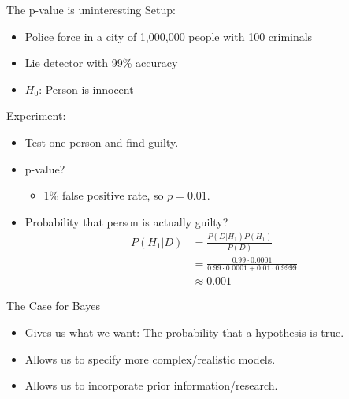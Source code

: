 \begin{frame}{The p-value is uninteresting}
Setup:
	\begin{itemize}
		\item Police force in a city of 1,000,000 people with 100 criminals
		\item Lie detector with 99\% accuracy
		\item $H_0$: Person is innocent
	\end{itemize}
Experiment:
	\begin{itemize}
		\item Test one person and find guilty.
		\item p-value?
		\pause
		\begin{itemize}
			\item 1\% false positive rate, so $p = 0.01$.
		\end{itemize}
		\pause
		\item Probability that person is actually guilty?
		\pause
		\begin{align*}
			P(H_1|D) &= \frac{P(D|H_1)P(H_1)}{P(D)} \\
					 &= \frac{0.99 \cdot 0.0001}
					   		 {0.99 \cdot 0.0001 + 0.01 \cdot 0.9999} \\
					 &\approx 0.001
		\end{align*}
	\end{itemize}
\end{frame}

\begin{frame}{The Case for Bayes}
	\begin{itemize}
		\item Gives us what we want: The probability that a hypothesis is true.
		\item Allows us to specify more complex/realistic models.
		\item Allows us to incorporate prior information/research.
	\end{itemize}
\end{frame}
